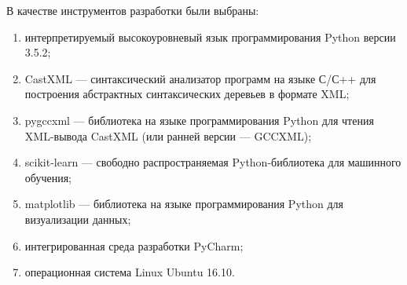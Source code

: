В качестве инструментов разработки были выбраны:
\begin{enumerate}
  \item интерпретируемый высокоуровневый язык программирования Python версии 3.5.2;~\cite{python}
  \item CastXML --- синтаксический анализатор программ на языке С/С++ для построения абстрактных синтаксических деревьев в формате XML;~\cite{castxml}
  \item pygccxml --- библиотека на языке программирования Python для чтения XML-вывода CastXML (или ранней версии --- GCCXML);~\cite{pygccxml}
  \item scikit-learn --- свободно распространяемая Python-библиотека для машинного обучения;~\cite{scikit} 
  \item matplotlib --- библиотека на языке программирования Python для визуализации данных;~\cite{matplotlib}
  \item интегрированная среда разработки PyCharm;
  \item операционная система Linux Ubuntu 16.10.
\end{enumerate}

